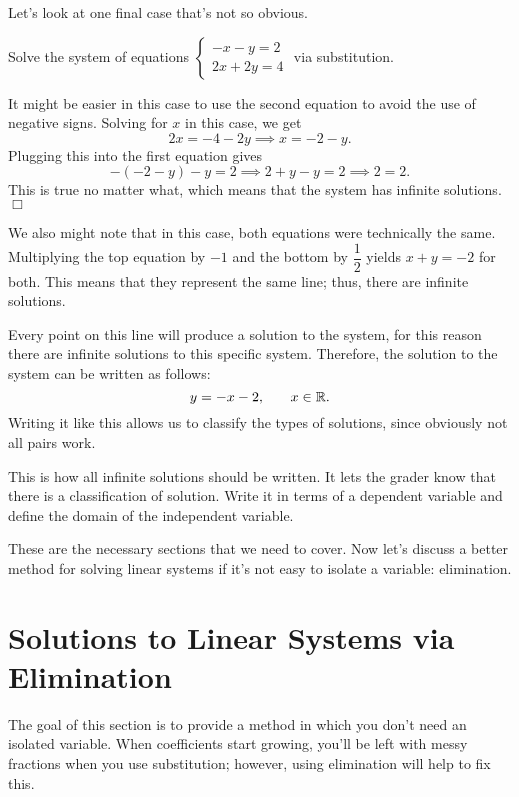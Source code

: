 \documentclass[../book.tex]{subfiles}
\begin{document}
Let's look at one final case that's not so obvious.
\begin{example}
Solve the system of equations $\begin{cases} -x-y=2 \\ 2x+2y=4 \end{cases}$ via substitution.
\end{example}
\begin{solution}
It might be easier in this case to use the second equation to avoid the use of negative signs.  Solving for $x$ in this case, we get $$2x=-4-2y \implies x=-2-y.$$  Plugging this into the first equation gives $$-(-2-y)-y=2 \implies 2+y-y=2 \implies 2=2.$$  This is true no matter what, which means that the system has infinite solutions.  $\Box$
\end{solution}
We also might note that in this case, both equations were technically the same.  Multiplying the top equation by $-1$ and the bottom by $\dfrac{1}{2}$ yields $x+y=-2$ for both.  This means that they represent the same line; thus, there are infinite solutions.

Every point on this line will produce a solution to the system, for this reason there are infinite solutions to this specific system.  Therefore, the solution to the system can be written as follows: $$y=-x-2, \hspace{0.25in} x\in\mathbb{R}.$$  Writing it like this allows us to classify the types of solutions, since obviously not all pairs work.

\begin{remark}
This is how all infinite solutions should be written.  It lets the grader know that there is a classification of solution.  Write it in terms of a dependent variable and define the domain of the independent variable.
\end{remark}

These are the necessary sections that we need to cover.  Now let's discuss a better method for solving linear systems if it's not easy to isolate a variable: elimination.
\section{Solutions to Linear Systems via Elimination}
\noindent The goal of this section is to provide a method in which you don't need an isolated variable.  When coefficients start growing, you'll be left with messy fractions when you use substitution; however, using elimination will help to fix this.
\end{document}
